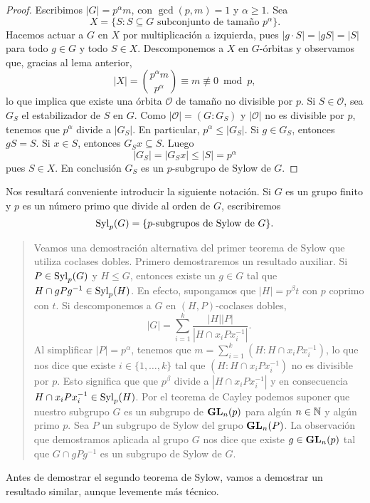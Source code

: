 \begin{proof}
Escribimos $|G|=p^\alpha m$, con $\gcd(p,m)=1$ y $\alpha\geq1$. Sea 
\[
X=\{S:S\subseteq G\text{ subconjunto de tamaño $p^\alpha$}\}.
\]
Hacemos actuar a $G$ en $X$ por multiplicación a izquierda, pues $|g\cdot S|=|gS|=|S|$ para todo $g\in G$ y todo $S\in X$. Descomponemos a $X$
en $G$-órbitas y observamos que, gracias al lema anterior,  
\[
|X|= \binom{p^\alpha m}{p^\alpha}\equiv m\not\equiv 0\bmod p,
\] 	
lo que implica que existe una órbita $\mathcal{O}$ de tamaño no divisible por $p$. Si $S\in\mathcal{O}$, sea $G_S$ el estabilizador de $S$ en $G$. Como
$|\mathcal{O}|=(G:G_S)$ y $|\mathcal{O}|$ no es divisible por $p$, tenemos que $p^\alpha$ divide a $|G_S|$. En particular, $p^\alpha\leq |G_S|$. Si $g\in G_S$, entonces
$gS=S$. Si $x\in S$, entonces $G_Sx\subseteq S$. Luego
\[
|G_S|=|G_Sx|\leq |S|=p^\alpha
\]
pues $S\in X$. En conclusión $G_S$ es un $p$-subgrupo de Sylow de $G$. 
\end{proof}

Nos resultará conveniente introducir la siguiente notación. 
Si $G$ es un grupo finito y $p$ es un número primo que divide al orden de $G$, escribiremos
\[
\mathrm{Syl}_p(G)=\{\text{$p$-subgrupos de Sylow de $G$}\}.
\]


\begin{quote}
Veamos una demostración alternativa del primer teorema de Sylow 
que utiliza coclases dobles. 
Primero demostraremos un resultado auxiliar. Si $P\in\mathrm{Syl}_p(G)$ y $H\leq G$, entonces  
existe un $g\in G$ tal que $H\cap gPg^{-1}\in\mathrm{Syl}_p(H)$. En efecto, supongamos que
$|H|=p^\beta t$ con $p$ coprimo con $t$. 
Si descomponemos a $G$ en $(H,P)$-coclases dobles, 
\[
|G|=\sum_{i=1}^k \frac{|H||P|}{|H\cap x_iPx_i^{-1}|}.
\]
Al simplificar $|P|=p^\alpha$, tenemos que $m=\sum_{i=1}^k(H:H\cap x_iPx_i^{-1})$, lo que nos dice 
que existe $i\in\{1,\dots,k\}$ tal que 
$(H:H\cap x_iPx_i^{-1})$ no es divisible por $p$. Esto significa que que 
$p^\beta$ divide a $|H\cap x_iPx_i^{-1}|$ y en consecuencia $H\cap x_iPx_i^{-1}\in\mathrm{Syl}_p(H)$. 
Por el teorema de Cayley podemos suponer que nuestro subgrupo $G$ es un subgrupo
de $\mathbf{GL}_n(p)$ para algún $n\in\mathbb{N}$ y algún primo $p$. Sea $P$ un subgrupo de Sylow
del grupo $\mathbf{GL}_n(P)$. La observación que demostramos
aplicada al grupo $G$ nos dice que existe $g\in \mathbf{GL}_n(p)$ tal que $G\cap gPg^{-1}$ es un subgrupo de Sylow de $G$.  
\end{quote}

Antes de demostrar el segundo teorema de Sylow, vamos a demostrar un resultado similar, aunque levemente más técnico.

